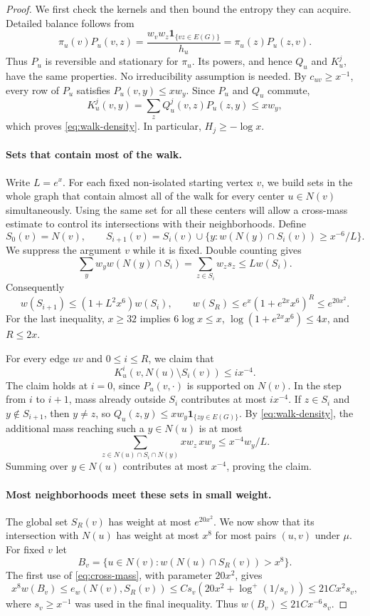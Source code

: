 \begin{proof}
We first check the kernels and then bound the entropy they can acquire.
Detailed balance follows from
\[
 \pi_u(v)P_u(v,z)
 =\frac{w_vw_z\mathbf1_{\{vz\in E(G)\}}}{h_u}
 =\pi_u(z)P_u(z,v).
\]
Thus $P_u$ is reversible and stationary for $\pi_u$.  Its powers, and hence
$Q_u$ and $K_u^j$, have the same properties.  No irreducibility assumption
is needed.  By $c_{uv}\ge x^{-1}$, every row of $P_u$ satisfies
$P_u(v,y)\le xw_y$.  Since $P_u$ and $Q_u$ commute,
\[
 K_u^j(v,y)=\sum_zQ_u^j(v,z)P_u(z,y)\le xw_y,
\]
which proves \eqref{eq:walk-density}.  In particular, $H_j\ge-\log x$.

\paragraph{Sets that contain most of the walk.}
Write $L=e^x$.  For each fixed non-isolated starting vertex $v$, we build
sets in the whole graph that contain almost all of the walk for every
center $u\in N(v)$ simultaneously.  Using the same set for all these
centers will allow a cross-mass estimate to control its intersections
with their neighborhoods.  Define
\[
 S_0(v)=N(v),\qquad
 S_{i+1}(v)=S_i(v)\cup
 \{y:w(N(y)\cap S_i(v))\ge x^{-6}/L\}.
\]
We suppress the argument $v$ while it is fixed.  Double counting gives
\[
 \sum_yw_yw(N(y)\cap S_i)
 =\sum_{z\in S_i}w_zs_z\le Lw(S_i).
\]
Consequently
\[
 w(S_{i+1})\le(1+L^2x^6)w(S_i),\qquad
 w(S_R)\le e^x(1+e^{2x}x^6)^R\le e^{20x^2}.
\]
For the last inequality, $x\ge32$ implies $6\log x\le x$,
$\log(1+e^{2x}x^6)\le4x$, and $R\le2x$.

For every edge $uv$ and $0\le i\le R$, we claim that
\begin{equation}
 K_u^i(v,N(u)\setminus S_i(v))\le ix^{-4}.
 \label{eq:walk-leakage}
\end{equation}
The claim holds at $i=0$, since $P_u(v,\cdot)$ is supported on $N(v)$.
In the step from $i$ to $i+1$, mass already outside $S_i$ contributes at
most $ix^{-4}$.  If $z\in S_i$ and $y\notin S_{i+1}$, then $y\ne z$,
so $Q_u(z,y)\le xw_y\mathbf1_{\{zy\in E(G)\}}$.  By
\eqref{eq:walk-density}, the additional mass reaching such a $y\in N(u)$
is at most
\[
 \sum_{z\in N(u)\cap S_i\cap N(y)}xw_z\,xw_y
 \le x^{-4}w_y/L.
\]
Summing over $y\in N(u)$ contributes at most $x^{-4}$, proving the claim.

\paragraph{Most neighborhoods meet these sets in small weight.}
The global set $S_R(v)$ has weight at most $e^{20x^2}$.  We now show
that its intersection with $N(u)$ has weight at most $x^8$ for most
pairs $(u,v)$ under $\mu$.
For fixed $v$ let
\[
 B_v=\{u\in N(v):w(N(u)\cap S_R(v))>x^8\}.
\]
The first use of \eqref{eq:cross-mass}, with parameter $20x^2$,
gives
\[
 x^8w(B_v)\le e_w(N(v),S_R(v))
 \le Cs_v(20x^2+\log^+(1/s_v))
 \le21Cx^2s_v,
\]
where $s_v\ge x^{-1}$ was used in the final inequality.  Thus
$w(B_v)\le21Cx^{-6}s_v$.


\end{proof}
